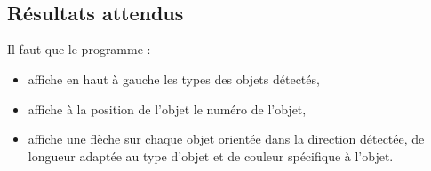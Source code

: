 \vspace{0.2cm}
\noindent
\begin{minipage}[c]{\textwidth}
  \centering
  \\
  \label{fig.Input2}
\end{minipage}\\
\vspace{0.2cm}


\newpage
\subsection{Résultats attendus}
\noindent Il faut que le programme :
\begin{itemize}
  \item affiche en haut à gauche les types des objets détectés,
  \item affiche à la position de l'objet le numéro de l'objet,
  \item affiche une flèche sur chaque objet orientée dans la direction détectée, de longueur adaptée au type d'objet et de couleur spécifique à l'objet.
\end{itemize}

\vspace{0.2cm}
\noindent
\begin{minipage}[c]{\textwidth}
  \centering
  \\
  \label{fig.Resultats}
\end{minipage}\\

